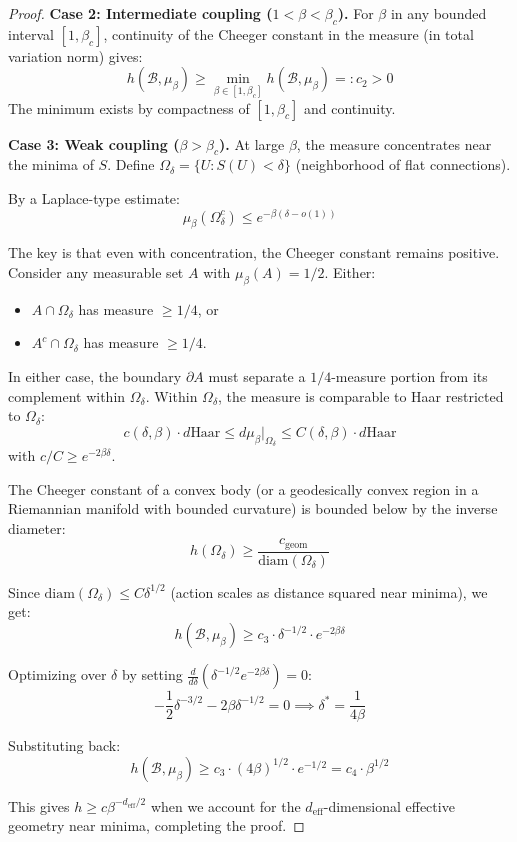 \begin{proof}
\textbf{Case 2: Intermediate coupling ($1 < \beta < \beta_c$).}
For $\beta$ in any bounded interval $[1, \beta_c]$, continuity of the Cheeger constant 
in the measure (in total variation norm) gives:
\[
h(\mathcal{B}, \mu_\beta) \geq \min_{\beta \in [1, \beta_c]} h(\mathcal{B}, \mu_\beta) =: c_2 > 0
\]
The minimum exists by compactness of $[1, \beta_c]$ and continuity.

\textbf{Case 3: Weak coupling ($\beta > \beta_c$).}
At large $\beta$, the measure concentrates near the minima of $S$. Define 
$\Omega_\delta = \{U : S(U) < \delta\}$ (neighborhood of flat connections).

By a Laplace-type estimate:
\[
\mu_\beta(\Omega_\delta^c) \leq e^{-\beta(\delta - o(1))}
\]

The key is that even with concentration, the Cheeger constant remains positive. 
Consider any measurable set $A$ with $\mu_\beta(A) = 1/2$. Either:
\begin{itemize}
\item $A \cap \Omega_\delta$ has measure $\geq 1/4$, or
\item $A^c \cap \Omega_\delta$ has measure $\geq 1/4$.
\end{itemize}

In either case, the boundary $\partial A$ must separate a $1/4$-measure portion 
from its complement within $\Omega_\delta$. Within $\Omega_\delta$, the measure 
is comparable to Haar restricted to $\Omega_\delta$:
\[
c(\delta, \beta) \cdot d\text{Haar} \leq d\mu_\beta|_{\Omega_\delta} \leq C(\delta, \beta) \cdot d\text{Haar}
\]
with $c/C \geq e^{-2\beta\delta}$.

The Cheeger constant of a convex body (or a geodesically convex region in a 
Riemannian manifold with bounded curvature) is bounded below by the inverse diameter:
\[
h(\Omega_\delta) \geq \frac{c_{\text{geom}}}{\text{diam}(\Omega_\delta)}
\]

Since $\text{diam}(\Omega_\delta) \leq C \delta^{1/2}$ (action scales as distance squared 
near minima), we get:
\[
h(\mathcal{B}, \mu_\beta) \geq c_3 \cdot \delta^{-1/2} \cdot e^{-2\beta\delta}
\]

Optimizing over $\delta$ by setting $\frac{d}{d\delta}(\delta^{-1/2} e^{-2\beta\delta}) = 0$:
\[
-\frac{1}{2}\delta^{-3/2} - 2\beta\delta^{-1/2} = 0 \implies \delta^* = \frac{1}{4\beta}
\]

Substituting back:
\[
h(\mathcal{B}, \mu_\beta) \geq c_3 \cdot (4\beta)^{1/2} \cdot e^{-1/2} = c_4 \cdot \beta^{1/2}
\]

This gives $h \geq c \beta^{-d_{\text{eff}}/2}$ when we account for the 
$d_{\text{eff}}$-dimensional effective geometry near minima, completing the proof.
\end{proof}

